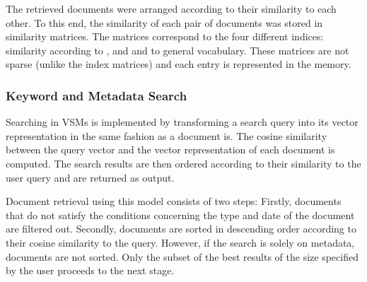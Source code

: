 
The retrieved documents were arranged according to their similarity to each other. To this end, the similarity of each pair of documents was stored in similarity matrices. The matrices correspond to the four different indices: similarity according to ,  and  and to general vocabulary. These matrices are not sparse (unlike the index matrices) and each entry is represented in the memory.   

\subsubsection{Keyword and Metadata Search}\label{sec:keyword_search}

Searching in VSMs is implemented by transforming a search query into its vector representation in the same fashion as a document is. The cosine similarity between the query vector and the vector representation of each document is computed. The search results are then ordered according to their similarity to the user query and are returned as output. 

Document retrieval using this model consists of two steps: Firstly, documents that do not satisfy the conditions concerning the type and date of the document are filtered out. Secondly, documents are sorted in descending order according to their cosine similarity to the query. However, if the search is solely on metadata, documents are not sorted. Only the subset of the best results of the size specified by the user proceeds to the next stage.

